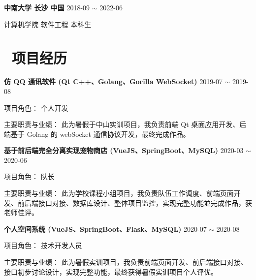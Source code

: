 \documentclass[11pt, a4paper]{article}
\begin{document}
\textbf{中南大学 \quad 长沙 \quad 中国} \hfill 2018-09 $\sim$ 2022-06

计算机学院 \quad 软件工程 \quad 本科生

\section{\color{CVBlue}\faUsers\ 项目经历}

\textbf{仿 QQ 通讯软件 (Qt C++、Golang、Gorilla WebSocket)} \hfill 2019-07 $\sim$ 2019-08

项目角色： \quad 个人开发

主要职责与业绩： \quad 此为暑假于中山实训项目，我负责前端 Qt 桌面应用开发、后端基于 Golang 的 webSocket 通信协议开发，最终完成作品。










\textbf{基于前后端完全分离实现宠物商店 (VueJS、SpringBoot、MySQL)} \hfill 2020-03 $\sim$ 2020-06

项目角色： \quad 队长

主要职责与业绩： \quad 此为学校课程小组项目，我负责队伍工作调度、前端页面开发、前后端接口对接、数据库设计、整体项目监控，实现完整功能並完成作品，获老师佳评。

\textbf{个人空间系统 (VueJS、SpringBoot、Flask、MySQL)} \hfill 2020-07 $\sim$ 2020-08

项目角色： \quad 技术开发人员

主要职责与业绩： \quad 此为暑假实训项目，我负责前端页面开发、前后端接口对接、接口初步讨论设计，实现完整功能，最终获得暑假实训项目个人评优。
\end{document}
